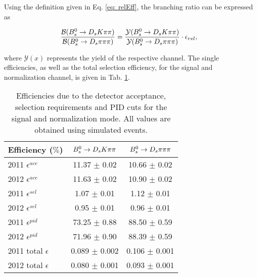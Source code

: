  Using the definition given in Eq. \ref{eq: relEff}, the branching ratio can be expressed as

\begin{equation}
\frac{\mathcal{B}({{B}^0_{s}}\rightarrow{\ensuremath{{D}_{s}}}{\ensuremath{K}}{\ensuremath{\pi}}{\ensuremath{\pi}})}{\mathcal{B}({{B}^0_{s}}\rightarrow{\ensuremath{{D}_{s}}}{\ensuremath{\pi}}{\ensuremath{\pi}}{\ensuremath{\pi}})} = \frac{\mathcal{Y}({{B}^0_{s}}\rightarrow{\ensuremath{{D}_{s}}}{\ensuremath{K}}{\ensuremath{\pi}}{\ensuremath{\pi}})}{\mathcal{Y}({{B}^0_{s}}\rightarrow{\ensuremath{{D}_{s}}}{\ensuremath{\pi}}{\ensuremath{\pi}}{\ensuremath{\pi}})} \cdot \epsilon_{rel},
\label{eq: BRwEff}
\end{equation} 

where $\mathcal{Y}(x)$ represents the yield of the respective channel. \newline
The single efficiencies, as well as the total selection efficiency, for the signal and normalization channel, is given in Tab. \ref{tab: effTab}.

\begin{table}[h!]
\centering
\begin{tabular}{l c c}
Efficiency ($\%$) & ${{B}^0_{s}}\rightarrow{\ensuremath{{D}_{s}}}{\ensuremath{K}}{\ensuremath{\pi}}{\ensuremath{\pi}}$ & ${{B}^0_{s}}\rightarrow{\ensuremath{{D}_{s}}}{\ensuremath{\pi}}{\ensuremath{\pi}}{\ensuremath{\pi}}$\\
\hline
2011 $\epsilon^{acc}$ & 11.37 $\pm$ 0.02 & 10.66 $\pm$ 0.02\\
2012 $\epsilon^{acc}$ & 11.63 $\pm$ 0.02 & 10.90 $\pm$ 0.02\\
2011 $\epsilon^{sel}$ & 1.07 $\pm$ 0.01& 1.12 $\pm$ 0.01\\
2012 $\epsilon^{sel}$ & 0.95 $\pm$ 0.01& 0.96 $\pm$ 0.01\\
2011 $\epsilon^{pid}$ & 73.25 $\pm$ 0.88 & 88.50 $\pm$ 0.59\\
2012 $\epsilon^{pid}$ & 71.96 $\pm$ 0.90 & 88.39 $\pm$ 0.59\\
\hline
2011 total $\epsilon$ & 0.089 $\pm$  0.002& 0.106 $\pm$ 0.001\\
2012 total $\epsilon$ & 0.080 $\pm$  0.001& 0.093 $\pm$ 0.001\\
\hline
\end{tabular}
\caption{Efficiencies due to the detector acceptance, selection requirements and PID cuts for the signal and normalization mode. All values are obtained using simulated events.}
\label{tab: effTab}
\end{table}





